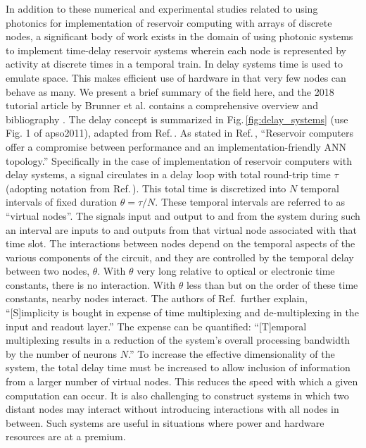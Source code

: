 In addition to these numerical and experimental studies related to using photonics for implementation of reservoir computing with arrays of discrete nodes, a significant body of work exists in the domain of using photonic systems to implement time-delay reservoir systems wherein each node is represented by activity at discrete times in a temporal train. In delay systems time is used to emulate space. This makes efficient use of hardware in that very few nodes can behave as many. We present a brief summary of the field here, and the 2018 tutorial article by Brunner et al. contains a comprehensive overview and bibliography \cite{brpe2018}. The delay concept is summarized in Fig.\,\ref{fig:delay_systems} (use Fig. 1 of apso2011), adapted from Ref.\,\cite{apso2011}. As stated in Ref.\,\cite{brpe2018}, ``Reservoir computers offer a compromise between performance and an implementation-friendly ANN topology.'' Specifically in the case of implementation of reservoir computers with delay systems, a signal circulates in a delay loop with total round-trip time $\tau$ (adopting notation from Ref.\,\cite{apso2011}). This total time is discretized into $N$ temporal intervals of fixed duration $\theta = \tau/N$. These temporal intervals are referred to as ``virtual nodes''. The signals input and output to and from the system during such an interval are inputs to and outputs from that virtual node associated with that time slot. The interactions between nodes depend on the temporal aspects of the various components of the circuit, and they are controlled by the temporal delay between two nodes, $\theta$. With $\theta$ very long relative to optical or electronic time constants, there is no interaction. With $\theta$ less than but on the order of these time constants, nearby nodes interact. The authors of Ref.\, further explain, ``[S]implicity is bought in expense of time multiplexing and de-multiplexing in the input and readout layer.'' The expense can be quantified: ``[T]emporal multiplexing results in a reduction of the system's overall processing bandwidth by the number of neurons $N$.'' To increase the effective dimensionality of the system, the total delay time must be increased to allow inclusion of information from a larger number of virtual nodes. This reduces the speed with which a given computation can occur. It is also challenging to construct systems in which two distant nodes may interact without introducing interactions with all nodes in between. Such systems are useful in situations where power and hardware resources are at a premium.

